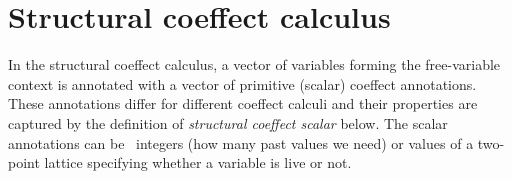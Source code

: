 %                                                            
%                                                           

\section{Structural coeffect calculus}
\label{sec:struct-calculus}

In the structural coeffect calculus, a vector of variables forming the free-variable context is 
annotated with a vector of primitive (scalar) coeffect annotations. These annotations differ
for different coeffect calculi and their properties are captured by the definition of \emph{structural 
coeffect scalar} below. The scalar annotations can be \eg~integers (how many past values we 
need) or values of a two-point lattice specifying whether a variable is live or not.

